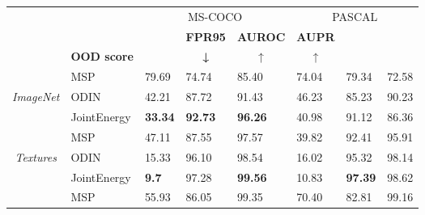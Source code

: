 \begin{table}[]
\begin{tabular}{clllllll}
\hline
\multicolumn{1}{l}{}                   &                    & \multicolumn{3}{c}{MS-COCO}                                                                & \multicolumn{3}{c}{PASCAL}                                          \\
\multicolumn{1}{l}{}                   &                    & \multicolumn{1}{c}{\textbf{}} & \multicolumn{1}{c}{\textbf{FPR95}} & \textbf{AUROC}        & \textbf{AUPR}         & \textbf{}            & \textbf{}            \\
\multicolumn{1}{l}{}                   & \textbf{OOD score} & \multicolumn{1}{c}{\textbf{}} & \multicolumn{1}{c}{\textbf{↓}}     & \multicolumn{1}{c}{↑} & \multicolumn{1}{c}{↑} & \multicolumn{1}{c}{} & \multicolumn{1}{c}{} \\ \hline
\multicolumn{1}{c|}{\textit{}}         & MSP                & 79.69                         & 74.74                              & 85.40                 & 74.04                 & 79.34                & 72.58                \\
\multicolumn{1}{c|}{\textit{ImageNet}} & ODIN               & 42.21                         & 87.72                              & 91.43                 & 46.23                 & 85.23                & 90.23                \\
\multicolumn{1}{c|}{\textit{}}         & JointEnergy        & \textbf{33.34}                & \textbf{92.73}                     & \textbf{96.26}        & 40.98                 & 91.12                & 86.36                \\ \cline{2-8} 
\multicolumn{1}{c|}{\textit{}}         & MSP                & 47.11                         & 87.55                              & 97.57                 & 39.82                 & 92.41                & 95.91                \\
\multicolumn{1}{c|}{\textit{Textures}} & ODIN               & 15.33                         & 96.10                              & 98.54                 & 16.02                 & 95.32                & 98.14                \\
\multicolumn{1}{c|}{\textit{}}         & JointEnergy        & \textbf{9.7}                  & 97.28                              & \textbf{99.56}        & 10.83                 & \textbf{97.39}       & 98.62                \\ \cline{2-8} 
\multicolumn{1}{c|}{\textit{}}         & MSP                & 55.93                         & 86.05                              & 99.35                 & 70.40                 & 82.81                & 99.16                \\

\end{tabular}
\end{table}
